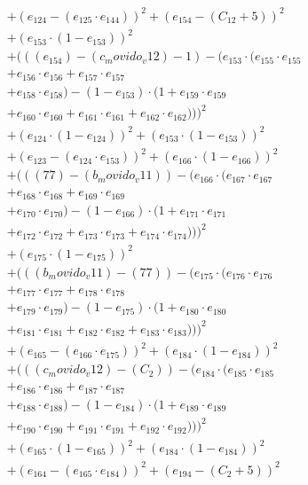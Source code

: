\documentclass[10pt, a4paper]{article}
\begin{document}
\begin{small}
\begin{align*}
& + (e_{124} - (e_{125} \cdot e_{144}))^{2} + (e_{154} - (C_{12} + 5))^{2} \\
& + (e_{153} \cdot (1 - e_{153}))^{2} \\
& + (((e_{154}) - (c_movido_v12) - 1) - (e_{153} \cdot (e_{155} \cdot e_{155} \\
& + e_{156} \cdot e_{156} + e_{157} \cdot e_{157} \\
& + e_{158} \cdot e_{158}) - (1 - e_{153}) \cdot (1 + e_{159} \cdot e_{159} \\
& + e_{160} \cdot e_{160} + e_{161} \cdot e_{161} + e_{162} \cdot e_{162})))^{2} \\
& + (e_{124} \cdot (1 - e_{124}))^{2} + (e_{153} \cdot (1 - e_{153}))^{2} \\
& + (e_{123} - (e_{124} \cdot e_{153}))^{2} + (e_{166} \cdot (1 - e_{166}))^{2} \\
& + (((77) - (b_movido_v11)) - (e_{166} \cdot (e_{167} \cdot e_{167} \\
& + e_{168} \cdot e_{168} + e_{169} \cdot e_{169} \\
& + e_{170} \cdot e_{170}) - (1 - e_{166}) \cdot (1 + e_{171} \cdot e_{171} \\
& + e_{172} \cdot e_{172} + e_{173} \cdot e_{173} + e_{174} \cdot e_{174})))^{2} \\
& + (e_{175} \cdot (1 - e_{175}))^{2} \\
& + (((b_movido_v11) - (77)) - (e_{175} \cdot (e_{176} \cdot e_{176} \\
& + e_{177} \cdot e_{177} + e_{178} \cdot e_{178} \\
& + e_{179} \cdot e_{179}) - (1 - e_{175}) \cdot (1 + e_{180} \cdot e_{180} \\
& + e_{181} \cdot e_{181} + e_{182} \cdot e_{182} + e_{183} \cdot e_{183})))^{2} \\
& + (e_{165} - (e_{166} \cdot e_{175}))^{2} + (e_{184} \cdot (1 - e_{184}))^{2} \\
& + (((c_movido_v12) - (C_{2})) - (e_{184} \cdot (e_{185} \cdot e_{185} \\
& + e_{186} \cdot e_{186} + e_{187} \cdot e_{187} \\
& + e_{188} \cdot e_{188}) - (1 - e_{184}) \cdot (1 + e_{189} \cdot e_{189} \\
& + e_{190} \cdot e_{190} + e_{191} \cdot e_{191} + e_{192} \cdot e_{192})))^{2} \\
& + (e_{165} \cdot (1 - e_{165}))^{2} + (e_{184} \cdot (1 - e_{184}))^{2} \\
& + (e_{164} - (e_{165} \cdot e_{184}))^{2} + (e_{194} - (C_{2} + 5))^{2} \\

\end{align*}
\end{small}
\end{document}
